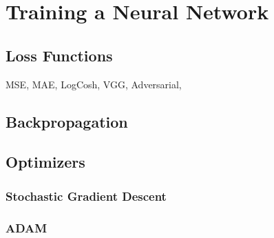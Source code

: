 \section{Training a Neural Network}


\subsection{Loss Functions}
MSE, MAE, LogCosh, VGG, Adversarial, 

\subsection{Backpropagation}

\subsection{Optimizers}

\subsubsection{Stochastic Gradient Descent}


\subsubsection{ADAM}

